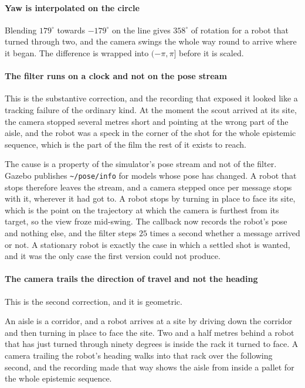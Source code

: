 \documentclass[11pt,a4paper]{article}
\theoremstyle{definition}
\newcommand{\code}[1]{\texttt{\small #1}}
\begin{document}
\paragraph{Yaw is interpolated on the circle} Blending $179^\circ$ towards
$-179^\circ$ on the line gives $358^\circ$ of rotation for a robot that
turned through two, and the camera swings the whole way round to arrive where
it began. The difference is wrapped into $(-\pi, \pi]$ before it is scaled.

\paragraph{The filter runs on a clock and not on the pose stream} This is the
substantive correction, and the recording that exposed it looked like a
tracking failure of the ordinary kind. At the moment the scout arrived at its
site, the camera stopped several metres short and pointing at the wrong part of
the aisle, and the robot was a speck in the corner of the shot for the whole
epistemic sequence, which is the part of the film the rest of it exists to
reach.

The cause is a property of the simulator's pose stream and not of the filter.
Gazebo publishes \code{\textasciitilde/pose/info} for models whose pose has
changed. A robot that stops therefore leaves the stream, and a camera stepped
once per message stops with it, wherever it had got to. A robot stops by
turning in place to face its site, which is the point on the trajectory at
which the camera is furthest from its target, so the view froze mid-swing. The
callback now records the robot's pose and nothing else, and the filter steps
$25$ times a second whether a message arrived or not. A stationary robot is
exactly the case in which a settled shot is wanted, and it was the only case
the first version could not produce.

\paragraph{The camera trails the direction of travel and not the heading} This
is the second correction, and it is geometric.

An aisle is a corridor, and a robot arrives at a site by driving down the
corridor and then turning in place to face the site. Two and a half metres
behind a robot that has just turned through ninety degrees is inside the rack
it turned to face. A camera trailing the robot's heading walks into that rack
over the following second, and the recording made that way shows the aisle from
inside a pallet for the whole epistemic sequence.
\end{document}
